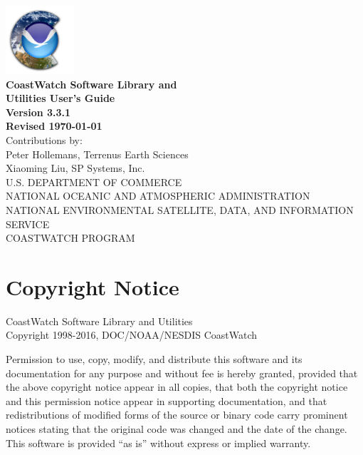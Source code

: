 \begin{titlepage}

  \begin{center}
    \includegraphics[height=1in]{icons/cdat.png} \\
    \vspace{0.5cm}
    {\Large \bf CoastWatch Software Library and \\ Utilities User's Guide} \\
    \vspace{1cm}
    {\large \bf Version 3.3.1 \\ Revised \today} \\
    \vspace{6cm} 
    {\small Contributions by: \\ Peter Hollemans, Terrenus Earth Sciences} \\
    {\small Xiaoming Liu, SP Systems, Inc.} \\
    \vspace{2cm}
    {\small U.S. DEPARTMENT OF COMMERCE \\
    NATIONAL OCEANIC AND ATMOSPHERIC ADMINISTRATION \\
    NATIONAL ENVIRONMENTAL SATELLITE, DATA, AND INFORMATION SERVICE \\
    COASTWATCH PROGRAM} \\
  \end{center}

\end{titlepage}


\section*{Copyright Notice}

CoastWatch Software Library and Utilities \\
Copyright 1998-2016, DOC/NOAA/NESDIS CoastWatch

Permission to use, copy, modify, and distribute this software and
its documentation for any purpose and without fee is hereby granted,
provided that the above copyright notice appear in all copies, that
both the copyright notice and this permission notice appear in
supporting documentation, and that redistributions of modified forms
of the source or binary code carry prominent notices stating that the
original code was changed and the date of the change.  This software
is provided ``as is'' without express or implied warranty.

